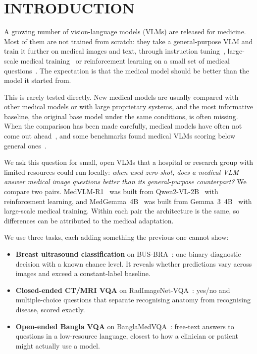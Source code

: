 \documentclass[doublecolumn]{ijcvsplatex}
\newcommand{\qwen}{Qwen2-VL}
\newcommand{\medvlm}{MedVLM-R1}
\newcommand{\gemma}{Gemma~3}
\newcommand{\medgemma}{MedGemma}
\begin{document}
\section{INTRODUCTION}
\label{sec_intro}

A growing number of vision-language models (VLMs) are released for medicine. Most of them are not trained from scratch: they take a general-purpose VLM and train it further on medical images and text, through instruction tuning~\cite{li2023llavamed,chen2024huatuogptvision}, large-scale medical training~\cite{sellergren2025medgemma} or reinforcement learning on a small set of medical questions~\cite{pan2025medvlmr1}. The expectation is that the medical model should be better than the model it started from.

This is rarely tested directly. New medical models are usually compared with other medical models or with large proprietary systems, and the most informative baseline, the original base model under the same conditions, is often missing. When the comparison has been made carefully, medical models have often not come out ahead~\cite{jeong2024medadapt}, and some benchmarks found medical VLMs scoring below general ones~\cite{hu2024omnimedvqa}.

We ask this question for small, open VLMs that a hospital or research group with limited resources could run locally: \emph{when used zero-shot, does a medical VLM answer medical image questions better than its general-purpose counterpart?} We compare two pairs. \medvlm{}~\cite{pan2025medvlmr1} was built from \qwen{}-2B~\cite{wang2024qwen2vl} with reinforcement learning, and \medgemma{}~4B~\cite{sellergren2025medgemma} was built from \gemma{}~4B~\cite{gemma3} with large-scale medical training. Within each pair the architecture is the same, so differences can be attributed to the medical adaptation.

We use three tasks, each adding something the previous one cannot show:
\begin{itemize}
\item \textbf{Breast ultrasound classification} on BUS-BRA~\cite{gomezflores2024busbra}: one binary diagnostic decision with a known chance level. It reveals whether predictions vary across images and exceed a constant-label baseline.
\item \textbf{Closed-ended CT/MRI VQA} on RadImageNet-VQA~\cite{butsanets2025radimagenetvqa}: yes/no and multiple-choice questions that separate recognising anatomy from recognising disease, scored exactly.
\item \textbf{Open-ended Bangla VQA} on BanglaMedVQA~\cite{ahmed2026banglamedvqa}: free-text answers to questions in a low-resource language, closest to how a clinician or patient might actually use a model.
\end{itemize}
\end{document}
